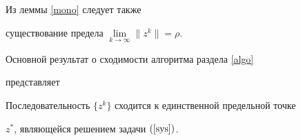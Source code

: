 Из леммы \ref{mono} следует также 


существование предела $\lim\limits_{k\to\infty} \|z^k\| = \rho $.





Основной результат о сходимости алгоритма раздела \ref{algo}


представляет





\begin{thmnonum}\label{cnvrg}


Последовательность $\{z^k\}$ сходится к единственной предельной точке


$z^\ast$, являющейся решением задачи $(\ref{sys})$.


\end{thmnonum}





